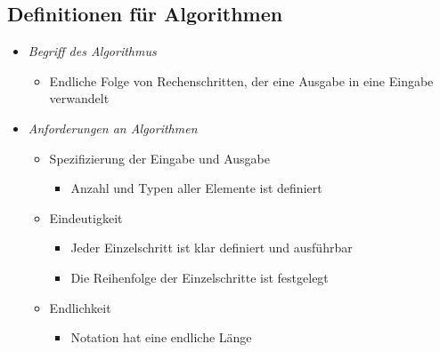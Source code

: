 \subsection{Definitionen für Algorithmen}
\begin{itemize}
    \item \textit{Begriff des Algorithmus}
        \begin{itemize}
        	\item Endliche Folge von Rechenschritten, der eine Ausgabe in eine Eingabe verwandelt 
        \end{itemize}
        
    \item \textit{Anforderungen an Algorithmen}
        \begin{itemize}
            \item Spezifizierung der Eingabe und Ausgabe 
              \begin{itemize}
                    \item[] Anzahl und Typen aller Elemente ist definiert
              \end{itemize}
          \item Eindeutigkeit
              \begin{itemize}
                    \item[] Jeder Einzelschritt ist klar definiert und ausführbar 
                    \item[] Die Reihenfolge der Einzelschritte ist festgelegt
              \end{itemize}
            \item Endlichkeit
              \begin{itemize}
                    \item[] Notation hat eine endliche Länge
              \end{itemize}
        \end{itemize}


\end{itemize}
